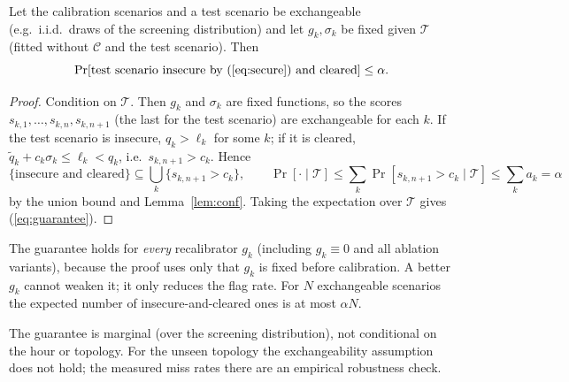 \begin{theorem}\label{thm:conf}
Let the calibration scenarios and a test scenario be exchangeable (e.g.\ i.i.d.\ draws of
the screening distribution) and let $g_k,\sigma_k$ be fixed given $\mathcal T$ (fitted
without $\mathcal C$ and the test scenario). Then
\begin{equation}
\Pr[\text{test scenario insecure by (\ref{eq:secure}) and cleared}]\le\alpha .
\label{eq:guarantee}
\end{equation}
\end{theorem}
\begin{proof}
Condition on $\mathcal T$. Then $g_k$ and $\sigma_k$ are fixed functions, so the scores
$s_{k,1},\dots,s_{k,n},s_{k,n+1}$ (the last for the test scenario) are exchangeable for each $k$.
If the test scenario is insecure, $q_k>\ell_k$ for some $k$; if it is cleared,
$\tilde q_k+c_k\sigma_k\le\ell_k<q_k$, i.e.\ $s_{k,n+1}>c_k$. Hence
\[
\{\text{insecure and cleared}\}\subseteq\bigcup_{k}\{s_{k,n+1}>c_k\},\qquad
\Pr[\cdot\mid\mathcal T]\le\sum_k\Pr[s_{k,n+1}>c_k\mid\mathcal T]\le\sum_k a_k=\alpha
\]
by the union bound and Lemma~\ref{lem:conf}. Taking the expectation over $\mathcal T$
gives (\ref{eq:guarantee}).
\end{proof}
\begin{corollary}\label{cor:any}
The guarantee holds for \emph{every} recalibrator $g_k$ (including $g_k\equiv0$ and all
ablation variants), because the proof uses only that $g_k$ is fixed before calibration.
A better $g_k$ cannot weaken it; it only reduces the flag rate. For $N$ exchangeable
scenarios the expected number of insecure-and-cleared ones is at most $\alpha N$.
\end{corollary}
\begin{remark}
The guarantee is marginal (over the screening distribution), not conditional on the
hour or topology. For the unseen topology the exchangeability assumption does not hold;
the measured miss rates there are an empirical robustness check.
\end{remark}

